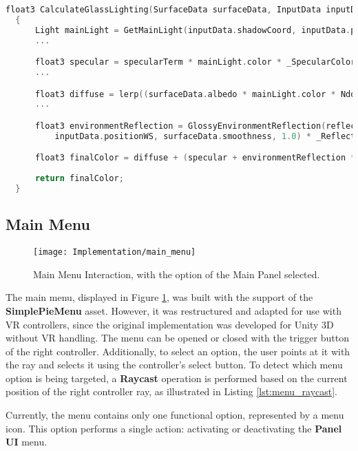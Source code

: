 \begin{lstlisting}[language=C++, caption={Lighting Glass Texture Partial Calculation.}, label={lst:lighting_glass}]
  float3 CalculateGlassLighting(SurfaceData surfaceData, InputData inputData, float fresnel)
  {
      Light mainLight = GetMainLight(inputData.shadowCoord, inputData.positionWS, inputData.shadowMask);
      ...

      float3 specular = specularTerm * mainLight.color * _SpecularColor.rgb * surfaceData.smoothness;
      ...

      float3 diffuse = lerp((surfaceData.albedo * mainLight.color * NdotL * 0.1),surfaceData.albedo, _BlendFactor);
      ...     

      float3 environmentReflection = GlossyEnvironmentReflection(reflectionVector, 
          inputData.positionWS, surfaceData.smoothness, 1.0) * _ReflectionIntensity;

      float3 finalColor = diffuse + (specular + environmentReflection * fresnel);
      
      return finalColor;
  }
\end{lstlisting}

\subsection*{Main Menu}
\label{sec:main_menu}

 \begin{figure}[h!]
    \centering
    \texttt{[image: Implementation/main\_menu]}
    \caption{Main Menu Interaction, with the option of the Main Panel selected.}
    \label{fig:main_menu}
\end{figure}

The main menu, displayed in Figure \ref{fig:main_menu}, was built with the support of the \textbf{SimplePieMenu} asset.
However, it was restructured and adapted for use with \gls{VR} controllers, since the original implementation was developed for Unity \gls{3D} without \gls{VR} handling.
The menu can be opened or closed with the trigger button of the right controller.
Additionally, to select an option, the user points at it with the ray and selects it using the controller’s select button. To detect which menu option is being targeted, a \textbf{Raycast} operation is performed based on the current position of the right controller ray, as illustrated in Listing \ref{lst:menu_raycast}.

Currently, the menu contains only one functional option, represented by a menu icon. This option performs a single action: activating or deactivating the \textbf{Panel \gls{UI}} menu.

